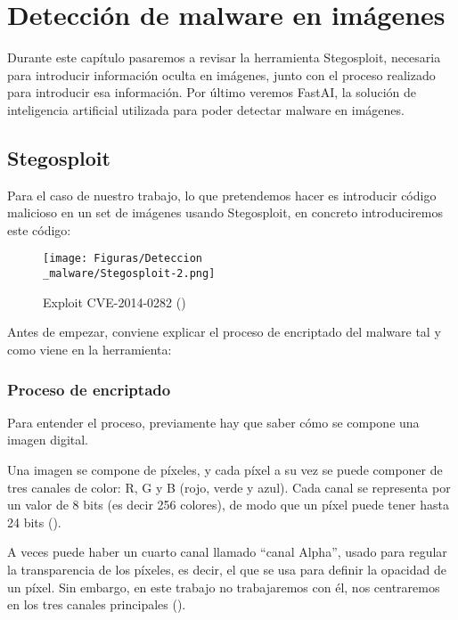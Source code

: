\chapter{Detección de malware en imágenes}
\label{ch:det_mal}

Durante este capítulo pasaremos a revisar la herramienta Stegosploit, necesaria para introducir información oculta en imágenes, junto con el proceso realizado para introducir esa información. Por último veremos FastAI, la solución de inteligencia artificial utilizada para poder detectar malware en imágenes.

\section{Stegosploit}

Para el caso de nuestro trabajo, lo que pretendemos hacer es introducir código malicioso en un set de imágenes usando Stegosploit, en concreto introduciremos este código:

\begin{figure}[H]
  \centering
  \texttt{[image: Figuras/Deteccion\\\_malware/Stegosploit-2.png]}
  \label{fig:exploit}
  \caption{Exploit CVE-2014-0282 (\cite{stegosploit})}
\end{figure}

Antes de empezar, conviene explicar el proceso de encriptado del malware tal y como viene en la herramienta:

\subsection{Proceso de encriptado}

Para entender el proceso, previamente hay que saber cómo se compone una imagen digital.

Una imagen se compone de píxeles, y cada píxel a su vez se puede componer de tres canales de color: R, G y B (rojo, verde y azul). Cada canal se representa por un valor de 8 bits (es decir 256 colores), de modo que un píxel puede tener hasta 24 bits (\cite{pixel}). %

A veces puede haber un cuarto canal llamado ``canal Alpha'', usado para regular la transparencia de los píxeles, es decir, el que se usa para definir la opacidad de un píxel. Sin embargo, en este trabajo no trabajaremos con él, nos centraremos en los tres canales principales (\cite{alpha-channel}). %

